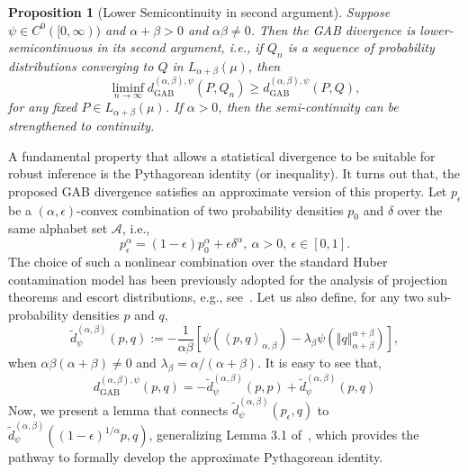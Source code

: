 \documentclass[11pt]{article}
\theoremstyle{plain}
\newtheorem{proposition}{Proposition}
\theoremstyle{remark}
\newcommand{\Acal}{\mathcal{A}}
\newcommand{\dGAB}{d_{\mathrm{GAB}}}
\newcommand{\norm}[1]{\left\Vert #1 \right\Vert}
\newcommand{\inner}[1]{\left\langle #1\right\rangle}
\begin{document}
\begin{proposition}[Lower Semicontinuity in second argument]
    Suppose $\psi \in C^0([0, \infty))$ and $\alpha + \beta > 0$ and $\alpha\beta \neq 0$. Then the GAB divergence is lower-semicontinuous in its second argument, i.e., if $Q_n$ is a sequence of probability distributions converging to $Q$ in $L_{\alpha+\beta}(\mu)$, then
    \begin{equation}
        \liminf_{n\rightarrow \infty} \dGAB^{(\alpha,\beta),\psi}(P, Q_n) \geq \dGAB^{(\alpha,\beta),\psi}(P, Q),
        \label{eqn:liminf-gab-div-second}
    \end{equation}
    \noindent for any fixed $P \in L_{\alpha+\beta}(\mu)$. If $\alpha > 0$, then the semi-continuity can be strengthened to continuity.
\end{proposition}

A fundamental property that allows a statistical divergence to be suitable for robust inference is the Pythagorean identity (or inequality). It turns out that, the proposed GAB divergence satisfies an approximate version of this property. Let $p_\epsilon$ be a $(\alpha,\epsilon)$-convex combination of two probability densities $p_0$ and $\delta$ over the same alphabet set $\Acal$, i.e.,
\begin{equation}
    p_\epsilon^\alpha = (1-\epsilon)p_0^\alpha + \epsilon \delta^\alpha, \
    \alpha > 0, \ \epsilon \in [0, 1].
    \label{eqn:alpha-convex-comb}
\end{equation}
\noindent The choice of such a nonlinear combination over the standard Huber contamination model has been previously adopted for the analysis of projection theorems and escort distributions, e.g., see~\cite{amari2010information, ghosh2021scale, gayen2021projection}. Let us also define, for any two sub-probability densities $p$ and $q$,
\begin{equation}
    \tilde{d}_{\psi}^{(\alpha,\beta)}(p, q) := -\frac{1}{\alpha\beta} \left[ \psi\left( \inner{p,q}_{\alpha,\beta} \right) -\lambda_\beta \psi\left( \norm{q}_{\alpha+\beta}^{\alpha+\beta} \right)\right],
    \label{eqn:dtilde-defn}
\end{equation}
\noindent when $\alpha\beta(\alpha+\beta)\neq 0$ and $\lambda_\beta = \alpha/(\alpha+\beta)$. It is easy to see that,
\begin{equation}
    \dGAB^{(\alpha,\beta),\psi}(p,q) = -\tilde{d}_{\psi}^{(\alpha,\beta)}(p,p) + \tilde{d}_{\psi}^{(\alpha,\beta)}(p, q)
    \label{eqn:dtilde-to-gabdiv}
\end{equation}
\noindent Now, we present a lemma that connects $\tilde{d}_{\psi}^{(\alpha,\beta)}(p_\epsilon,q)$ to $\tilde{d}_{\psi}^{(\alpha,\beta)}((1-\epsilon)^{1/\alpha} p,q)$, generalizing Lemma 3.1 of~\cite{fujisawa2008robust}, which provides the pathway to formally develop the approximate Pythagorean identity.
\end{document}
